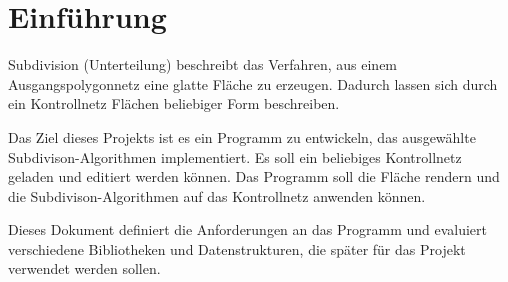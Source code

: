 \chapter{Einführung}

Subdivision (Unterteilung) beschreibt das Verfahren, aus einem Ausgangspolygonnetz eine glatte Fläche zu erzeugen.
Dadurch lassen sich durch ein Kontrollnetz Flächen beliebiger Form beschreiben.

Das Ziel dieses Projekts ist es ein Programm zu entwickeln, das ausgewählte Subdivison-Algorithmen implementiert.
Es soll ein beliebiges Kontrollnetz geladen und editiert werden können.
Das Programm soll die Fläche rendern und die Subdivison-Algorithmen auf das Kontrollnetz anwenden können.

Dieses Dokument definiert die Anforderungen an das Programm und evaluiert verschiedene Bibliotheken und Datenstrukturen,
die später für das Projekt verwendet werden sollen.